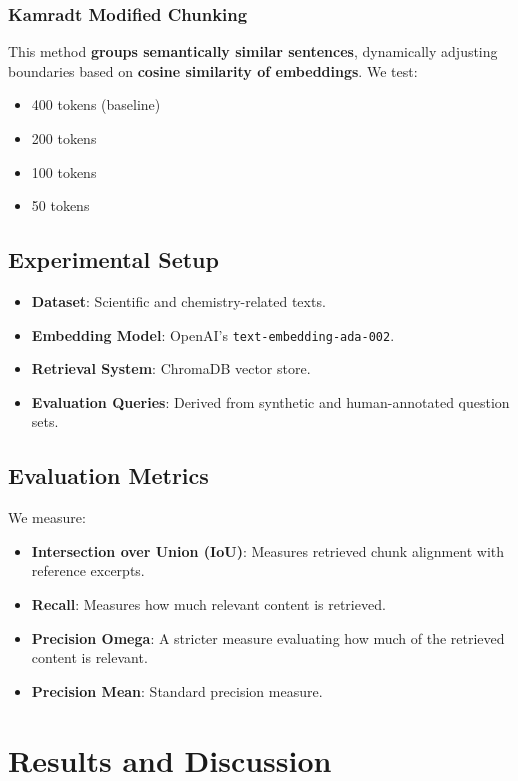 \documentclass[a4paper,12pt]{article}
\begin{document}
\subsubsection{Kamradt Modified Chunking}
This method \textbf{groups semantically similar sentences}, dynamically adjusting boundaries based on \textbf{cosine similarity of embeddings}. We test:
\begin{itemize}
    \item 400 tokens (baseline)
    \item 200 tokens
    \item 100 tokens
    \item 50 tokens
\end{itemize}

\subsection{Experimental Setup}
\begin{itemize}
    \item \textbf{Dataset}: Scientific and chemistry-related texts.
    \item \textbf{Embedding Model}: OpenAI’s \texttt{text-embedding-ada-002}.
    \item \textbf{Retrieval System}: ChromaDB vector store.
    \item \textbf{Evaluation Queries}: Derived from synthetic and human-annotated question sets.
\end{itemize}

\subsection{Evaluation Metrics}
We measure:
\begin{itemize}
    \item \textbf{Intersection over Union (IoU)}: Measures retrieved chunk alignment with reference excerpts.
    \item \textbf{Recall}: Measures how much relevant content is retrieved.
    \item \textbf{Precision Omega}: A stricter measure evaluating how much of the retrieved content is relevant.
    \item \textbf{Precision Mean}: Standard precision measure.
\end{itemize}

\section{Results and Discussion}
\end{document}
